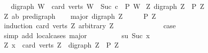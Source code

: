 \begin{isabellebody}
\ \ {\isasymLongrightarrow}\ {\isacharparenleft}{\kern0pt}digraph\ W\ {\isasymLongrightarrow}\ card\ {\isacharparenleft}{\kern0pt}verts\ W{\isacharparenright}{\kern0pt}\ {\isacharequal}{\kern0pt}\ {\isacharparenleft}{\kern0pt}Suc\ c{\isacharparenright}{\kern0pt}\ {\isasymLongrightarrow}\ P\ W{\isacharparenright}{\kern0pt}{\isachardoublequoteclose}\isanewline
{}\ {\isachardoublequoteopen}{\isasymAnd}Z{\isachardot}{\kern0pt}\ digraph\ Z\ {\isasymLongrightarrow}\ P\ Z{\isachardoublequoteclose}\isanewline
%
\isadelimproof
%
\endisadelimproof
%
\isatagproof
{}\isamarkupfalse%
\ {\isacharminus}{\kern0pt}\ \isanewline
\ \ \isamarkupfalse%
\ Z{\isacharcolon}{\kern0pt}{\isacharcolon}{\kern0pt}\ {\isachardoublequoteopen}{\isacharparenleft}{\kern0pt}{\isacharprime}{\kern0pt}a{\isacharcomma}{\kern0pt}{\isacharprime}{\kern0pt}b{\isacharparenright}{\kern0pt}\ pre{\isacharunderscore}{\kern0pt}digraph{\isachardoublequoteclose}\isanewline
\ \ \isamarkupfalse%
\ major{\isacharcolon}{\kern0pt}\ {\isachardoublequoteopen}digraph\ Z{\isachardoublequoteclose}\isanewline
\ \ \isamarkupfalse%
\ \isamarkupfalse%
\ {\isachardoublequoteopen}P\ Z{\isachardoublequoteclose}\isanewline
\ \ \isamarkupfalse%
\ {\isacharparenleft}{\kern0pt}induction\ {\isachardoublequoteopen}card\ {\isacharparenleft}{\kern0pt}verts\ Z{\isacharparenright}{\kern0pt}{\isachardoublequoteclose}\ arbitrary{\isacharcolon}{\kern0pt}\ Z{\isacharparenright}{\kern0pt}\isanewline
\ \ \ \ \isamarkupfalse%
\ {}\isanewline
\ \ \ \ \isamarkupfalse%
\ \isamarkupfalse%
\ {\isacharquery}{\kern0pt}case\isanewline
\ \ \ \ \ \ \isamarkupfalse%
\ {\isacharparenleft}{\kern0pt}simp\ add{\isacharcolon}{\kern0pt}\ local{\isachardot}{\kern0pt}cases{\isacharparenleft}{\kern0pt}{}{\isacharparenright}{\kern0pt}\ major{\isacharparenright}{\kern0pt}\ \isanewline
\ \ \isamarkupfalse%
\isanewline
\ \ \ \ \isamarkupfalse%
\ su{\isacharcolon}{\kern0pt}\ {\isacharparenleft}{\kern0pt}Suc\ x{\isacharparenright}{\kern0pt}\isanewline
\ \ \ \ \isamarkupfalse%
\ {\isachardoublequoteopen}{\isacharparenleft}{\kern0pt}{\isasymAnd}Z{\isachardot}{\kern0pt}\ x\ {\isacharequal}{\kern0pt}\ card\ {\isacharparenleft}{\kern0pt}verts\ Z{\isacharparenright}{\kern0pt}\ {\isasymLongrightarrow}\ digraph\ Z\ {\isasymLongrightarrow}\ P\ Z{\isacharparenright}{\kern0pt}{\isachardoublequoteclose}\isanewline
\ \ \ \ \isamarkupfalse%

\end{isabellebody}
